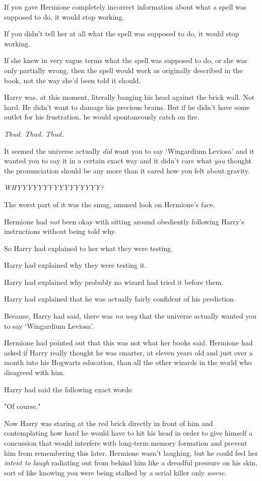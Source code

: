 If you gave Hermione completely incorrect information about what a spell was 
supposed to do, it would stop working.

If you didn't tell her at all what the spell was supposed to do, it would stop 
working.

If she knew in very vague terms what the spell was supposed to do, or she was 
only partially wrong, then the spell would work as originally described in the 
book, not the way she'd been told it should.

Harry was, at this moment, literally banging his head against the brick wall. 
Not hard. He didn't want to damage his precious brains. But if he didn't have 
some outlet for his frustration, he would spontaneously catch on fire.

\emph{Thud. Thud. Thud.}

It seemed the universe actually \emph{did} want you to say `Wingardium Leviosa' 
and it wanted you to say it in a certain exact way and it didn't care what 
\emph{you} thought the pronunciation should be any more than it cared how you 
felt about gravity.

\emph{WHYYYYYYYYYYYYYYYY?}

The worst part of it was the smug, amused look on Hermione's face.

Hermione had \emph{not} been okay with sitting around obediently following 
Harry's instructions without being told why.

So Harry had explained to her what they were testing.

Harry had explained why they were testing it.

Harry had explained why probably no wizard had tried it before them.

Harry had explained that he was actually fairly confident of his prediction.

Because, Harry had said, there was \emph{no way} that the universe actually 
wanted you to say `Wingardium Leviosa'.

Hermione had pointed out that this was not what her books said. Hermione had 
asked if Harry really thought he was smarter, at eleven years old and just over 
a month into his Hogwarts education, than all the other wizards in the world 
who disagreed with him.

Harry had said the following exact words:

"Of course."

Now Harry was staring at the red brick directly in front of him and 
contemplating how hard he would have to hit his head in order to give himself a 
concussion that would interfere with long-term memory formation and prevent him 
from remembering this later. Hermione wasn't laughing, but he could feel her 
\emph{intent to laugh} radiating out from behind him like a dreadful pressure 
on his skin, sort of like knowing you were being stalked by a serial killer 
only \emph{worse.}

